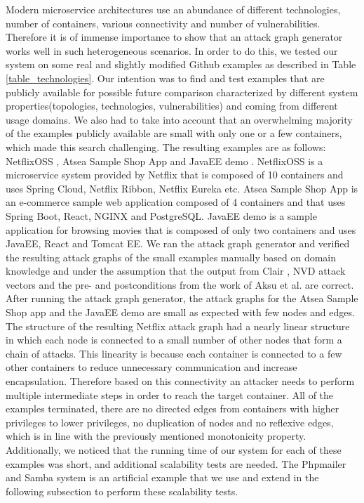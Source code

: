 Modern microservice architectures use an abundance of different technologies,  number of containers, various connectivity and number of vulnerabilities. Therefore it is of immense importance to show that an attack graph generator works well in such heterogeneous scenarios. In order to do this, we tested our system on some real and slightly modified Github examples as described in Table \ref{table_technologies}. Our intention was to find and test examples that are publicly available for possible future comparison characterized by different system properties(topologies, technologies, vulnerabilities) and coming from different usage domains. We also had to take into account that an overwhelming majority of the examples publicly available are small with only one or a few containers, which made this search challenging. The resulting examples are as follows: NetflixOSS \cite{netflixoss}, Atsea Sample Shop App \cite{atsea} and JavaEE demo \cite{java}. NetflixOSS is a microservice system provided by Netflix that is composed of 10 containers and uses Spring Cloud, Netflix Ribbon, Netflix Eureka etc. Atsea Sample Shop App is an e-commerce sample web application composed of 4 containers and that uses Spring Boot, React, NGINX and PostgreSQL. JavaEE demo is a sample application for browsing movies that is composed of only two containers and uses JavaEE, React and Tomcat EE. We ran the attack graph generator and verified the resulting attack graphs of the small examples manually based on domain knowledge and under the assumption that the output from Clair \cite{clair}, NVD attack vectors \cite{booth2013national} and the pre- and postconditions from the work of Aksu et al. \cite{aksu2018automated} are correct. After running the attack graph generator, the attack graphs for the Atsea Sample Shop app and the JavaEE demo are small as expected with few nodes and edges. The structure of the resulting Netflix attack graph had a nearly linear structure in which each node is connected to a small number of other nodes that form a chain of attacks. This linearity is because each container is connected to a few other containers to reduce unnecessary communication and increase encapsulation. Therefore based on this connectivity an attacker needs to perform multiple intermediate steps in order to reach the target container. All of the examples terminated, there are no directed edges from containers with higher privileges to lower privileges, no duplication of nodes and no reflexive edges, which is in line with the previously mentioned monotonicity property. Additionally, we noticed that the running time of our system for each of these examples was short, and additional scalability tests are needed. The Phpmailer \cite{phpmailer} and Samba \cite{samba} system is an artificial example that we use and extend in the following subsection to perform these scalability tests.
